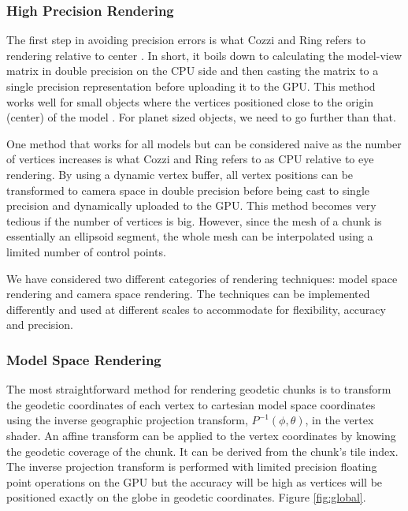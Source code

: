 \subsubsection{High Precision Rendering}

The first step in avoiding precision errors is what Cozzi and Ring refers to rendering relative to center \cite{cozzi11}. In short, it boils down to calculating the model-view matrix in double precision on the CPU side and then casting the matrix to a single precision representation before uploading it to the GPU. This method works well for small objects where the vertices positioned close to the origin (center) of the model \cite{cozzi11}. For planet sized objects, we need to go further than that.

One method that works for all models but can be considered naive as the number of vertices increases is what Cozzi and Ring refers to as CPU relative to eye rendering. By using a dynamic vertex buffer, all vertex positions can be transformed to camera space in double precision before being cast to single precision and dynamically uploaded to the GPU. This method becomes very tedious if the number of vertices is big. However, since the mesh of a chunk is essentially an ellipsoid segment, the whole mesh can be interpolated using a limited number of control points.

We have considered two different categories of rendering techniques: model space rendering and camera space rendering. The techniques can be implemented differently and used at different scales to accommodate for flexibility, accuracy and precision.

\subsubsection{Model Space Rendering}

The most straightforward method for rendering geodetic chunks is to transform the geodetic coordinates of each vertex to cartesian model space coordinates using the inverse geographic projection transform, $P^{-1}(\phi, \theta)$, in the vertex shader. An affine transform can be applied to the vertex coordinates by knowing the geodetic coverage of the chunk. It can be derived from the chunk's tile index. The inverse projection transform is performed with limited precision floating point operations on the GPU but the accuracy will be high as vertices will be positioned exactly on the globe in geodetic coordinates. Figure \ref{fig:global}.

